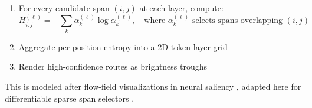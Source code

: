 \begin{enumerate}[leftmargin=1.5em]
  \item For every candidate span \( (i,j) \) at each layer, compute:
  \begin{equation}
    H_{i:j}^{(\ell)} = -\sum_k \alpha_k^{(\ell)} \log \alpha_k^{(\ell)}, \quad \text{where } \alpha_k^{(\ell)} \text{ selects spans overlapping } (i, j)
    \label{eq:entropy_local}
  \end{equation}
  \item Aggregate per-position entropy into a 2D token-layer grid
  \item Render high-confidence routes as brightness troughs
\end{enumerate}

This is modeled after flow-field visualizations in neural saliency \cite{olah2018building}, adapted here for differentiable sparse span selectors \cite{pereyra2017regularizing, liu2024structured}.
